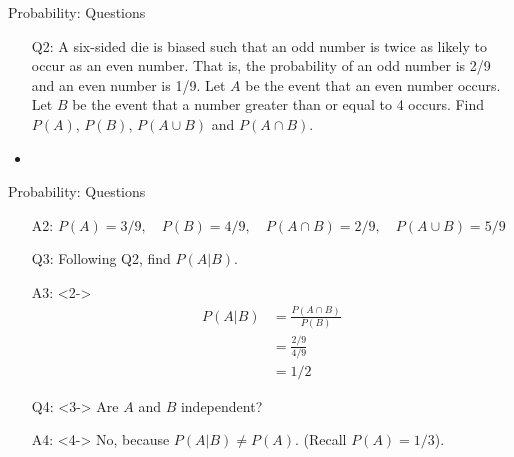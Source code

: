 \documentclass[10pt, xcolor=table]{beamer}
\begin{document}
\begin{frame}{Probability: Questions}
\begin{itemize}
  \setlength{\itemsep}{15pt}
\item[Q2:] A six-sided die is biased such that an odd number is twice as likely to occur as an even number. That is, the probability of an odd number is 2/9 and an even number is 1/9. Let $A$ be the event that an even number occurs. Let $B$ be the event that a number greater than or equal to 4 occurs. Find $P(A)$, $P(B)$, $P(A \cup B)$ and $P(A \cap B)$.
\item<2->[A2:] 
\end{itemize}
\end{frame}

\begin{frame}{Probability: Questions}
\bigskip
\begin{itemize}
\setlength{\itemsep}{15pt}
\item[A2:] {\color{red} $P(A) = 3/9, \quad P(B) = 4/9, \quad P(A \cap B) = 2/9, \quad P(A \cup B) = 5/9$}
\item[Q3:] Following Q2, find $P(A|B)$.
\item[A3:]<2->{ \color{red}
\begin{align*}
P(A|B) &= \frac{P(A \cap B)}{P(B)} \\
&= \frac{2/9}{4/9}\\
&= 1/2
\end{align*}}
\item[Q4:]<3-> Are $A$ and $B$ independent?
\item[A4:]<4-> {\color{red} No, because $P(A|B) \neq P(A)$. (Recall $P(A) = 1/3$).}
\end{itemize}
\end{frame}
\end{document}
